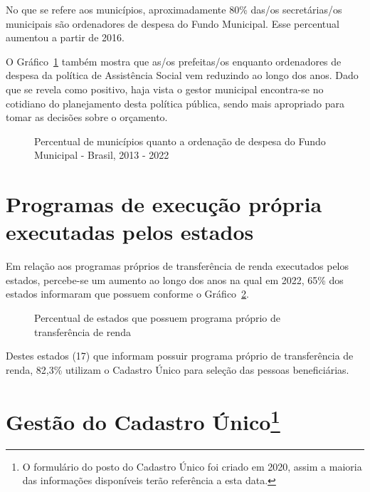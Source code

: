 \documentclass[
  letterpaper,
  DIV=11,
  numbers=noendperiod]{scrreprt}
\begin{document}
No que se refere aos municípios, aproximadamente 80\% das/os
secretárias/os municipais são ordenadores de despesa do Fundo Municipal.
Esse percentual aumentou a partir de 2016.

O Gráfico~\ref{fig-munic_ord_despesa} também mostra que as/os
prefeitas/os enquanto ordenadores de despesa da política de Assistência
Social vem reduzindo ao longo dos anos. Dado que se revela como
positivo, haja vista o gestor municipal encontra-se no cotidiano do
planejamento desta política pública, sendo mais apropriado para tomar as
decisões sobre o orçamento.

\begin{figure}


\caption{\label{fig-munic_ord_despesa}Percentual de municípios quanto a
ordenação de despesa do Fundo Municipal - Brasil, 2013 - 2022}

\end{figure}%

\section{Programas de execução própria executadas pelos
estados}\label{programas-de-execuuxe7uxe3o-pruxf3pria-executadas-pelos-estados}

Em relação aos programas próprios de transferência de renda executados
pelos estados, percebe-se um aumento ao longo dos anos na qual em 2022,
65\% dos estados informaram que possuem conforme o
Gráfico~\ref{fig-be_uf_renda}.

\begin{figure}


\caption{\label{fig-be_uf_renda}Percentual de estados que possuem
programa próprio de transferência de renda}

\end{figure}%

Destes estados (17) que informam possuir programa próprio de
transferência de renda, 82,3\% utilizam o Cadastro Único para seleção
das pessoas beneficiárias.

\section[Gestão do Cadastro Único]{\texorpdfstring{Gestão do Cadastro
Único\footnote{O formulário do posto do Cadastro Único foi criado em
  2020, assim a maioria das informações disponíveis terão referência a
  esta data.}}{Gestão do Cadastro Único}}\label{gestuxe3o-do-cadastro-uxfanico24}
\end{document}
